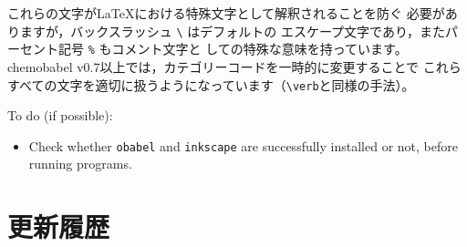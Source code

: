 \documentclass[12pt]{ltjsarticle}
\begin{document}
これらの文字が\LaTeX における特殊文字として解釈されることを防ぐ
必要がありますが，バックスラッシュ \verb|\| はデフォルトの
エスケープ文字であり，またパーセント記号 \verb|%| もコメント文字と
しての特殊な意味を持っています。
\textsf{chemobabel} v0.7以上では，カテゴリーコードを一時的に変更することで
これらすべての文字を適切に扱うようになっています（\verb+\verb+と同様の手法）。

\clearpage

To do (if possible):
\begin{itemize}
\item Check whether \texttt{obabel} and \texttt{inkscape} are successfully
installed or not, before running programs.
\end{itemize}

\section{更新履歴}
\end{document}
